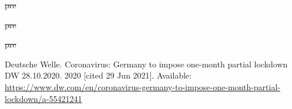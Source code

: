 \documentclass[10pt,letterpaper]{article}
\newlength{\cslhangindent}
\newlength{\csllabelwidth}
\newlength{\cslentryspacingunit} %
\newenvironment{CSLReferences}[2] %
 {%
  \setlength{\parindent}{0pt}
  \ifodd #1
  \let\oldpar\par
  \def\par{\hangindent=\cslhangindent\oldpar}
  \fi
  \setlength{\parskip}{#2\cslentryspacingunit}
 }%
 {}
\newcommand{\CSLLeftMargin}[1]{\parbox[t]{\csllabelwidth}{#1}}
\newcommand{\CSLRightInline}[1]{\parbox[t]{\linewidth - \csllabelwidth}{#1}\break}
\providecommand{\DIFdeltex}[1]{{\protect\color{red}\sout{#1}}}                      %
\providecommand{\DIFaddbegin}{} %
\providecommand{\DIFaddend}{} %
\providecommand{\DIFdelend}{} %
\providecommand{\DIFdel}[1]{\texorpdfstring{\DIFdeltex{#1}}{}} %
\newcommand{\DIFaddincludegraphics}[2][]{{\color{blue}\fbox{\DIFOincludegraphics[#1]{#2}}}} %
\DeclareRobustCommand{\DIFaddbegin}{\DIFOaddbegin \let\includegraphics\DIFaddincludegraphics} %
\DeclareRobustCommand{\DIFaddend}{\DIFOaddend \let\includegraphics\DIFOincludegraphics} %
\DeclareRobustCommand{\DIFdelend}{\DIFOaddend \let\includegraphics\DIFOincludegraphics} %
\begin{document}
\begin{CSLReferences}{0}{0}
\DIFdel{pre}%

\DIFdel{pre}%

\DIFdel{pre}%
\DIFdelend \DIFaddbegin \CSLRightInline{Deutsche Welle. Coronavirus: {Germany} to impose
one-month partial lockdown \textbar{} {DW} \textbar{} 28.10.2020. 2020
{[}cited 29 Jun 2021{]}. Available:
\url{https://www.dw.com/en/coronavirus-germany-to-impose-one-month-partial-lockdown/a-55421241}}
\DIFaddend 

\end{CSLReferences}

\nolinenumbers
\end{document}
